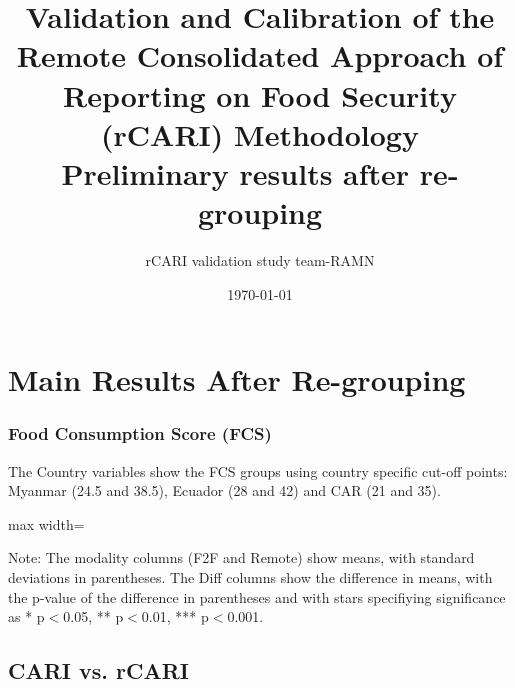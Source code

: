 \documentclass[11pt,harvard]{article}
\author{rCARI validation study team-RAMN}
\date{\today}
\title{Validation and Calibration of the Remote Consolidated Approach of Reporting on Food Security (rCARI) Methodology 
	\\ {\normalsize Preliminary results after re-grouping} }
\begin{document}
	\maketitle \vspace{-1cm}
	\onehalfspacing
	\pagebreak
	\setlength{\parskip}{6pt} %
	\tableofcontents
	\pagebreak
	
\section{Main Results After Re-grouping}

\subsubsection{Food Consumption Score (FCS)}

The Country variables show the FCS groups using country specific cut-off points: Myanmar (24.5 and 38.5), Ecuador (28 and 42) and CAR (21 and 35).

\begin{table}[htbp]
	\centering
	\begin{adjustbox}{max width=\textwidth}
		\begin{threeparttable}
			\caption{Impact of Survey Modality on Food Consumption Score and Groups}
			\scriptsize
			 
			\label{tab:FCS_Modality_All_Country}
			\begin{tablenotes}
				\item Note: The modality columns (F2F and Remote) show means, with standard deviations in parentheses. The Diff columns show the difference in means, with the p-value of the difference in parentheses and with stars specifiying significance as * p$<$0.05, ** p$<$0.01, *** p$<$0.001. 
			\end{tablenotes}
		\end{threeparttable}
	\end{adjustbox}
\end{table}

\subsection{CARI vs. rCARI}
\end{document}
